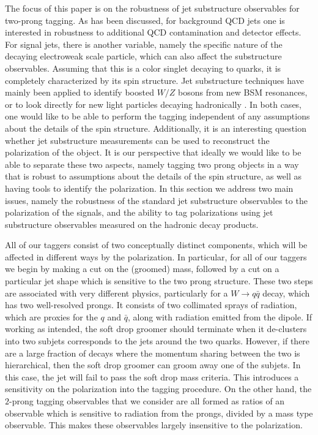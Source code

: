 \documentclass[11pt,letterpaper]{article}
\begin{document}
The focus of this paper is on the robustness of jet substructure
observables for two-prong tagging.
%
As has been discussed, for
background QCD jets one is interested in robustness to additional QCD
contamination and detector effects. For signal jets, there is another variable, namely the specific nature of the decaying electroweak scale particle, which can also affect the substructure observables.
%
Assuming
that this is a color singlet decaying to quarks, it is completely
characterized by its spin structure.
%
Jet substructure techniques have
mainly been applied to identify boosted $W/Z$ bosons from new BSM
resonances, or to look directly for new light particles decaying
hadronically \cite{CMS-PAS-EXO-17-001}.
%
In both cases, one would like
to be able to perform the tagging independent of any assumptions about
the details of the spin structure.
%
Additionally, it is an interesting
question whether jet substructure measurements can be used to
reconstruct the polarization of the object.
%
It is our perspective that
ideally we would like to be able to separate these two aspects, namely
tagging two prong objects in a way that is robust to assumptions about
the details of the spin structure, as well as having tools to identify
the polarization.
%
In this section we address two main issues, namely
the robustness of the standard jet substructure observables to the
polarization of the signals, and the ability to tag polarizations
using jet substructure observables measured on the hadronic decay
products.





All of our taggers consist of two conceptually distinct components, which will be affected in different ways by the polarization.
%
In particular, for all of our taggers we begin by making a cut on the (groomed) mass, followed by a cut on a particular jet shape which is sensitive to the two prong structure. These two steps are associated with very different physics, particularly for a $W\to q\bar q$ decay, which has two well-resolved prongs.
%
It consists of two collimated sprays of radiation, which are proxies for the $q$ and $\bar q$, along with radiation emitted from the dipole.
%
If working as intended, the soft drop groomer should terminate when it de-clusters into two subjets corresponds to the jets around the two quarks.
%
However, if there are a large fraction of decays where the momentum sharing between the two is hierarchical, then the soft drop groomer can groom away one of the subjets.
%
In this case, the jet will fail to pass the soft drop mass criteria.
%
This introduces a sensitivity on the polarization into the tagging procedure.
%
On the other hand, the $2$-prong tagging observables that we consider are all formed as ratios of an observable which is sensitive to radiation from the prongs, divided by a mass type observable.
%
This makes these observables largely insensitive to the polarization.
\end{document}
